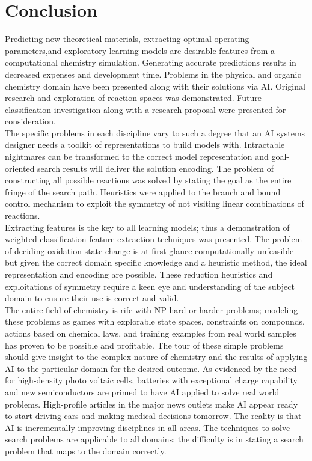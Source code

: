\documentclass{article}
\begin{document}
\newpage
\section{Conclusion}
Predicting new theoretical materials, extracting optimal operating parameters,and exploratory learning models are desirable features from a computational chemistry simulation. Generating accurate predictions results in decreased expenses and development time. Problems in the physical and organic chemistry domain have been presented along with their solutions via AI. Original research and exploration of reaction spaces was demonstrated. Future classification investigation along with a research proposal were presented for consideration. \\


The specific problems in each discipline vary to such a degree that an AI systems designer needs a toolkit of representations to build models with. Intractable nightmares can be transformed to the correct model representation and goal-oriented search results will deliver the solution encoding. The problem of constructing all possible reactions was solved by stating the goal as the entire fringe of the search path. Heuristics were applied to the branch and bound control mechanism to exploit the symmetry of not visiting linear combinations of reactions. \\

Extracting features is the key to all learning models; thus a demonstration of weighted classification feature extraction techniques was presented. The problem of deciding oxidation state change is at first glance computationally unfeasible but given the correct domain specific knowledge and a heuristic method, the ideal representation and encoding are possible. These reduction heuristics and exploitations of symmetry require a keen eye and understanding of the subject domain to ensure their use is correct and valid. \\

The entire field of chemistry is rife with NP-hard or harder problems; modeling these problems as games with explorable state spaces, constraints on compounds, actions based on chemical laws, and training examples from real world samples has proven to be possible and profitable. The tour of these simple problems should give insight to the complex nature of chemistry and the results of applying AI to the particular domain for the desired outcome. As evidenced by the need for high-density photo voltaic cells, batteries with exceptional charge capability and new semiconductors are primed to have AI applied to solve real world problems. High-profile articles in the major news outlets make AI appear ready to start driving cars and making medical decisions tomorrow. The reality is that AI is incrementally improving disciplines in all areas. The techniques to solve search problems are applicable to all domains; the difficulty is in stating a search problem that maps to the domain correctly. \\





\newpage


\end{document}
